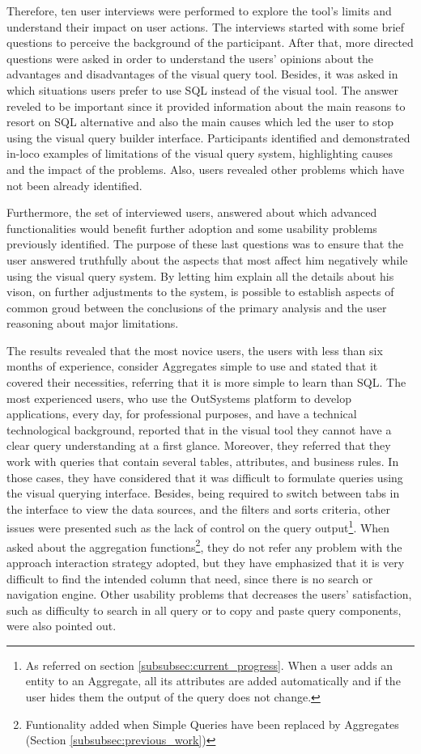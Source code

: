 Therefore, ten user interviews were performed to explore the tool's limits and understand their impact on user actions. The interviews started with some brief questions to perceive the background of the participant. After that, more directed questions were asked in order to understand the users' opinions about the advantages and disadvantages of the visual query tool. Besides, it was asked in which situations users prefer to use \gls{SQL} instead of the visual tool. The answer reveled to be important since it provided information about the main reasons to resort on \gls{SQL} alternative and also the main causes which led the user to stop using the visual query builder interface. Participants identified and demonstrated in-loco examples of limitations of the visual query system, highlighting causes and the impact of the problems. Also, users revealed other problems which have not been already identified.

Furthermore, the set of interviewed users, answered about which advanced functionalities would benefit further adoption and some usability problems previously identified. The purpose of these last questions was to ensure that the user answered truthfully about the aspects that most affect him negatively while using the visual query system. By letting him explain all the details about his vison, on further adjustments to the system, is possible to establish aspects of common groud between the conclusions of the primary analysis and the user reasoning about major limitations.

The results revealed that the most novice users, the users with less than six months of experience, consider Aggregates simple to use and stated that it covered their necessities, referring that it is more simple to learn than \gls{SQL}. The most experienced users, who use the OutSystems platform to develop applications, every day, for professional purposes, and have a technical technological background, reported that in the visual tool they cannot have a clear query understanding at a first glance. Moreover, they referred that they work with queries that contain several tables, attributes, and business rules. In those cases, they have considered that it was difficult to formulate queries using the visual querying interface. Besides, being required to switch between tabs in the interface to view the data sources, and the filters and sorts criteria, other issues were presented such as the lack of control on the query output\footnote{As referred on section \ref{subsubsec:current_progress}. When a user adds an entity to an Aggregate, all its attributes are added automatically and if the user hides them the output of the query does not change.}. When asked about the aggregation functions\footnote{Funtionality added when Simple Queries have been replaced by Aggregates (Section \ref{subsubsec:previous_work})}, they do not refer any problem with the approach interaction strategy adopted, but they have emphasized that it is very difficult to find the intended column that need, since there is no search or navigation engine. Other usability problems that decreases the users’ satisfaction, such as difficulty to search in all query or to copy and paste query components, were also pointed out.

